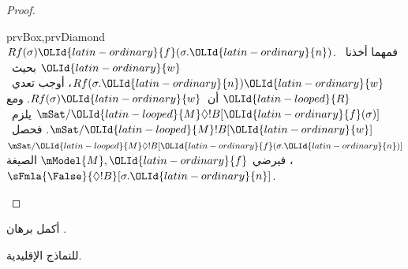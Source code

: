 \documentclass[../../../include/open-logic-section]{subfiles}
\begin{document}
\begin{proof}
\begin{tagenumerate}{prvBox,prvDiamond}
{{    $Rf(\sigma){\OLId{latin-ordinary}{f}}(\sigma.{\OLId{latin-ordinary}{n}})$. فمهما أخذنا~${\OLId{latin-ordinary}{w}}$ بحيث~$Rf(\sigma.{\OLId{latin-ordinary}{n}}){\OLId{latin-ordinary}{w}}$،
    أوجب تعدي~${\OLId{latin-looped}{R}}$ أن~$Rf(\sigma){\OLId{latin-ordinary}{w}}$. ومع
    $\mSat/{{\OLId{latin-looped}{M}}}{\Diamond !B}[{\OLId{latin-ordinary}{f}}(\sigma)]$ يلزم~$\mSat/{{\OLId{latin-looped}{M}}}{!B}[{\OLId{latin-ordinary}{w}}]$.
    فحصل~$\mSat/{{\OLId{latin-looped}{M}}}{\Diamond !B}[{\OLId{latin-ordinary}{f}}(\sigma.{\OLId{latin-ordinary}{n}})]$، فيرضي
    $\mModel{M}, {\OLId{latin-ordinary}{f}}$ الصيغة~$\sFmla{\False}{\Diamond !B}[\sigma.{\OLId{latin-ordinary}{n}}]$.}}{}
\end{tagenumerate}
\end{proof}

\begin{prob}
  أكمل برهان .
\end{prob}
\tagendprob

\begin{prop}
  للنماذج الإقليدية.
\end{prop}
\end{document}
